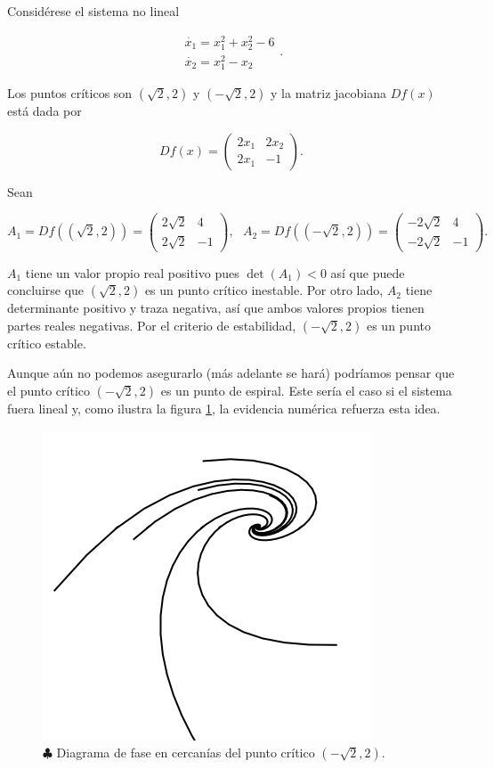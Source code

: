 \begin{example} \label{ex:nolinealhiperbolico}
Considérese el sistema no lineal

$$ \begin{array}{l} \dot{x_1} = x_1^2 + x_2^2 - 6 \\ \dot{x_2} = x_1^2 - x_2 \end{array}. $$

Los puntos críticos son $(\sqrt{2}, 2)$ y $(-\sqrt{2}, 2)$ y la matriz jacobiana $Df(x)$ está dada por

$$ Df(x) = \left( \begin{array}{ll} 2x_1 & 2x_2 \\ 2x_1 & -1 \end{array} \right).$$

Sean

$$
	A_1 = Df((\sqrt{2},2)) = \left(\begin{array}{ll} 2\sqrt{2} & 4 \\ 2\sqrt{2} & -1 \end{array} \right), \hspace{8pt}
	A_2 = Df((-\sqrt{2},2)) = \left(\begin{array}{ll} -2\sqrt{2} & 4 \\ -2\sqrt{2} & -1 \end{array} \right).	
$$

$A_1$ tiene un valor propio real positivo pues $\det(A_1) < 0$ así que puede concluirse que $(\sqrt{2}, 2)$ es un punto crítico inestable.
Por otro lado, $A_2$ tiene determinante positivo y traza negativa, así que ambos valores propios tienen partes reales negativas. Por el criterio de estabilidad, $(-\sqrt{2},2)$ es un punto crítico estable.

Aunque aún no podemos asegurarlo (más adelante se hará) podríamos pensar que el punto crítico $(-\sqrt{2}, 2)$ es un punto de espiral. Este sería el caso si el sistema fuera lineal y, como ilustra la figura \ref{fig:nolinealhiperbolico-espiral}, la evidencia numérica refuerza esta idea.

\begin{figure} \centering
\includegraphics[scale=0.45]{figures/nolinealhiperbolico-espiral.png}
\caption{$\clubsuit$ Diagrama de fase en cercanías del punto crítico $(-\sqrt{2}, 2)$.}
\label{fig:nolinealhiperbolico-espiral}
\end{figure}


\end{example}
